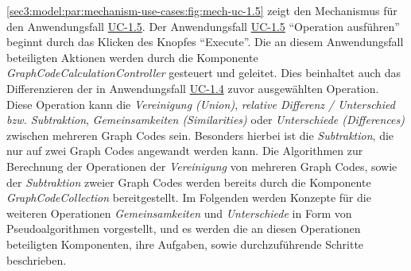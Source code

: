 \cref{sec3:model:par:mechanism-use-cases:fig:mech-uc-1.5} zeigt den Mechanismus für den Anwendungsfall \hyperref[sec3:model:uc-1.5]{UC-1.5}.
Der Anwendungsfall \hyperref[sec3:model:uc-1.5]{UC-1.5} \enquote{Operation ausführen} beginnt durch das Klicken des Knopfes \enquote{Execute}.
Die an diesem Anwendungsfall beteiligten Aktionen werden durch die Komponente \textit{GraphCodeCalculationController} gesteuert und geleitet.
Dies beinhaltet auch das Differenzieren der in Anwendungsfall \hyperref[sec3:model:uc-1.4]{UC-1.4} zuvor ausgewählten Operation.
Diese Operation kann die \textit{Vereinigung (Union)}, \textit{relative Differenz / Unterschied bzw. Subtraktion}, \textit{Gemeinsamkeiten (Similarities)} oder \textit{Unterschiede (Differences)} zwischen mehreren Graph Codes sein.
Besonders hierbei ist die \textit{Subtraktion}, die nur auf zwei Graph Codes angewandt werden kann.
Die Algorithmen zur Berechnung der Operationen der \textit{Vereinigung} von mehreren Graph Codes, sowie der \textit{Subtraktion} zweier Graph Codes werden bereits durch die Komponente \textit{GraphCodeCollection} bereitgestellt.
Im Folgenden werden Konzepte für die weiteren Operationen \textit{Gemeinsamkeiten} und \textit{Unterschiede} in Form von Pseudoalgorithmen vorgestellt, und es werden die an diesen Operationen beteiligten Komponenten, ihre Aufgaben, sowie durchzuführende Schritte beschrieben.



